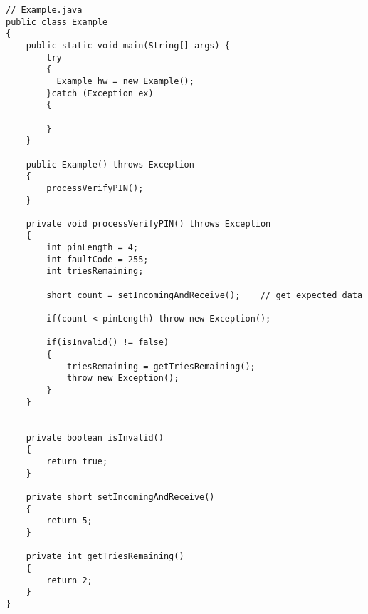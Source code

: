 \begin{lstlisting}[caption={Mocked Java example code from the Java Card samples},label={lst:example}]
// Example.java
public class Example 
{
    public static void main(String[] args) {
        try
        {
		  Example hw = new Example();
        }catch (Exception ex)
        {

        }
    }

    public Example() throws Exception
    {
        processVerifyPIN();
    }

    private void processVerifyPIN() throws Exception
    {
        int pinLength = 4;
        int faultCode = 255;
        int triesRemaining;

        short count = setIncomingAndReceive();    // get expected data

        if(count < pinLength) throw new Exception();

        if(isInvalid() != false)
        {
            triesRemaining = getTriesRemaining();
            throw new Exception();
        }
    }


    private boolean isInvalid()
    {
        return true;
    }

    private short setIncomingAndReceive()
    {
        return 5;
    }

    private int getTriesRemaining()
    {
        return 2;
    }
}
\end{lstlisting}

\newpage

